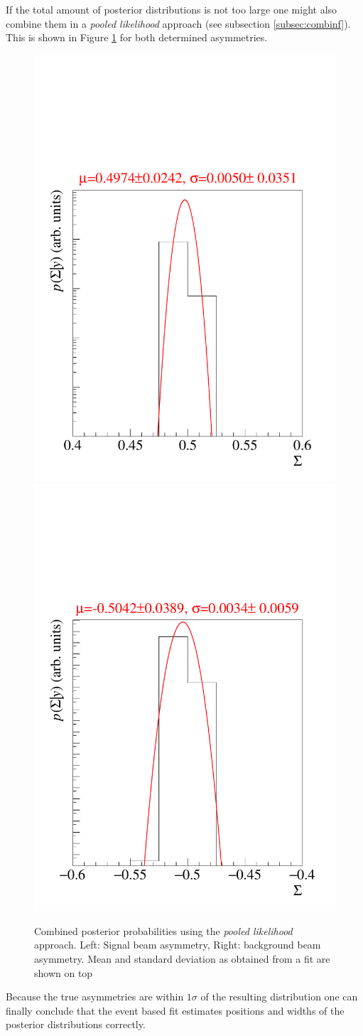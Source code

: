 If the total amount of posterior distributions is not too large one might also combine them in a \emph{pooled likelihood} approach (see subsection \ref{subsec:combinf}). This is shown in Figure \ref{fig:poollik} for both determined asymmetries.
\begin{figure}[htbp]
	\includegraphics[width=.49\linewidth]{../bayes/event_based_fit/plots/combined_post_mul.pdf}
	\includegraphics[width=.49\linewidth]{../bayes/event_based_fit/plots/combined_post_mul_bkg.pdf}
	\caption{Combined posterior probabilities using the \emph{pooled likelihood} approach. Left: Signal beam asymmetry, Right: background beam asymmetry. Mean and standard deviation as obtained from a  fit are shown on top}
	\label{fig:poollik}
\end{figure}
 Because the true asymmetries are within $1\sigma$ of the resulting distribution one can finally conclude that the event based fit estimates positions and widths of the posterior distributions correctly. 
 
